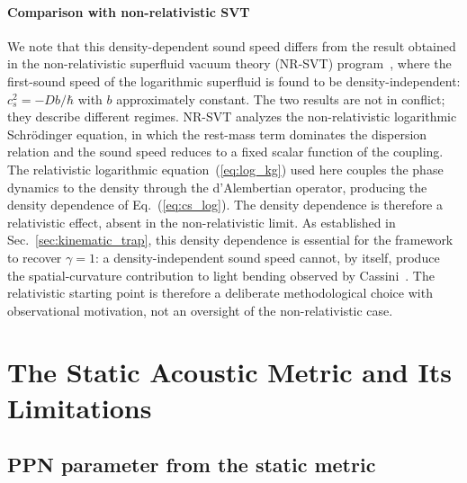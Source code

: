 \documentclass[12pt, a4paper]{article}
\begin{document}
\paragraph{Comparison with non-relativistic SVT}
We note that this density-dependent sound speed differs from the result obtained in the non-relativistic superfluid vacuum theory (NR-SVT) program~\cite{zloshchastiev_2023}, where the first-sound speed of the logarithmic superfluid is found to be density-independent: $c_s^2 = -Db/\hbar$ with $b$ approximately constant. The two results are not in conflict; they describe different regimes. NR-SVT analyzes the non-relativistic logarithmic Schr\"{o}dinger equation, in which the rest-mass term dominates the dispersion relation and the sound speed reduces to a fixed scalar function of the coupling. The relativistic logarithmic equation~(\ref{eq:log_kg}) used here couples the phase dynamics to the density through the d'Alembertian operator, producing the density dependence of Eq.~(\ref{eq:cs_log}). The density dependence is therefore a relativistic effect, absent in the non-relativistic limit. As established in Sec.~\ref{sec:kinematic_trap}, this density dependence is essential for the framework to recover $\gamma = 1$: a density-independent sound speed cannot, by itself, produce the spatial-curvature contribution to light bending observed by Cassini~\cite{bertotti_2003}. The relativistic starting point is therefore a deliberate methodological choice with observational motivation, not an oversight of the non-relativistic case.

\section{The Static Acoustic Metric and Its Limitations}
\label{sec:static}

\subsection{PPN parameter from the static metric}
\end{document}
